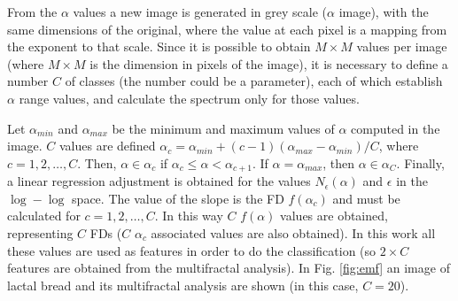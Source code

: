 \documentclass[oneside,a4paper,english,links]{amca}
\begin{document}
From the $\alpha$ values a new image is generated in grey scale ($\alpha$ image), with the same dimensions of the original, where the value at each pixel is a mapping from the exponent to that scale. Since it is possible to obtain $M\times M$ values per image (where $M\times M$ is the dimension in pixels of the image), it is necessary to define a number $C$ of classes (the number could be a parameter), each of which establish $\alpha$ range values, and calculate the spectrum only for those values.

Let $\alpha_{min}$ and  $\alpha_{max}$ be the minimum and maximum values of $\alpha$ computed in the image. $C$ values are defined $\alpha_{c} = \alpha_{min} + (c-1)(\alpha_{max}-\alpha_{min})/C$, where $c = 1,2,\dots,C$. Then, $\alpha \in \alpha_{c}$ if $\alpha_{c} \leq \alpha < \alpha_{c+1}$. If $\alpha = \alpha_{max}$, then $\alpha \in \alpha_{C}$. Finally, a linear regression adjustment is obtained for the values $N_{\epsilon}(\alpha)$ and $\epsilon$ in the $\log-\log$ space. The value of the slope is the FD $f(\alpha_{c})$ and must be calculated for $c = 1,2,\dots,C$. In this way $C$ $f(\alpha)$ values are obtained, representing $C$ FDs ($C$ $\alpha_{c}$ associated values are also obtained). In this work all these values are used as features in order to do the classification (so $2\times C$ features are obtained from the multifractal analysis). In Fig. \ref{fig:emf} an image of lactal bread and its multifractal analysis are shown (in this case, $C = 20$).
\end{document}
